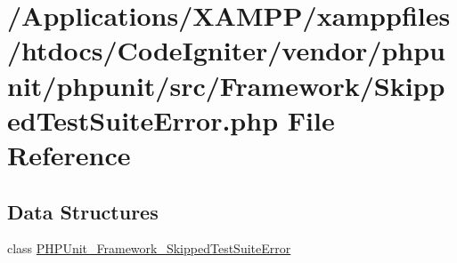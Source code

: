 \hypertarget{_skipped_test_suite_error_8php}{}\section{/\+Applications/\+X\+A\+M\+P\+P/xamppfiles/htdocs/\+Code\+Igniter/vendor/phpunit/phpunit/src/\+Framework/\+Skipped\+Test\+Suite\+Error.php File Reference}
\label{_skipped_test_suite_error_8php}
\subsection*{Data Structures}
\begin{DoxyCompactItemize}
\item 
class \mbox{\hyperlink{class_p_h_p_unit___framework___skipped_test_suite_error}{P\+H\+P\+Unit\+\_\+\+Framework\+\_\+\+Skipped\+Test\+Suite\+Error}}
\end{DoxyCompactItemize}
